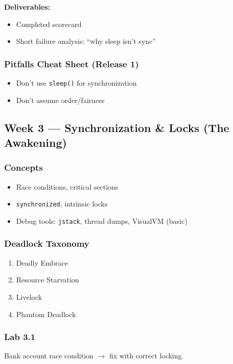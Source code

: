 \documentclass[11pt,a4paper]{article}
\begin{document}
	\textbf{Deliverables:}
	\begin{itemize}[leftmargin=*]
		\item Completed scorecard
		\item Short failure analysis: ``why sleep isn't sync''
	\end{itemize}
	
	\subsubsection*{Pitfalls Cheat Sheet (Release 1)}
	\begin{itemize}[leftmargin=*]
		\item Don't use \texttt{sleep()} for synchronization
		\item Don't assume order/fairness
	\end{itemize}
	
	\subsection*{Week 3 --- Synchronization \& Locks (The Awakening)}
	
	\subsubsection*{Concepts}
	\begin{itemize}[leftmargin=*]
		\item Race conditions, critical sections
		\item \texttt{synchronized}, intrinsic locks
		\item Debug tools: \texttt{jstack}, thread dumps, VisualVM (basic)
	\end{itemize}
	
	\subsubsection*{Deadlock Taxonomy}
	\begin{enumerate}[leftmargin=*]
		\item Deadly Embrace
		\item Resource Starvation
		\item Livelock
		\item Phantom Deadlock
	\end{enumerate}
	
	\subsubsection*{Lab 3.1}
	Bank account race condition $\rightarrow$ fix with correct locking.
	
\end{document}

